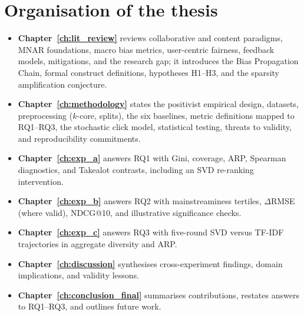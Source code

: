 \section{Organisation of the thesis}
\begin{itemize}
  \item \textbf{Chapter~\ref{ch:lit_review}} reviews collaborative and content paradigms, MNAR foundations, macro bias metrics, user-centric fairness, feedback models, mitigations, and the research gap; it introduces the Bias Propagation Chain, formal construct definitions, hypotheses H1--H3, and the sparsity amplification conjecture.
  \item \textbf{Chapter~\ref{ch:methodology}} states the positivist empirical design, datasets, preprocessing ($k$-core, splits), the six baselines, metric definitions mapped to RQ1--RQ3, the stochastic click model, statistical testing, threats to validity, and reproducibility commitments.
  \item \textbf{Chapter~\ref{ch:exp_a}} answers RQ1 with Gini, coverage, ARP, Spearman diagnostics, and Takealot contrasts, including an SVD re-ranking intervention.
  \item \textbf{Chapter~\ref{ch:exp_b}} answers RQ2 with mainstreaminess tertiles, $\Delta$RMSE (where valid), NDCG@10, and illustrative significance checks.
  \item \textbf{Chapter~\ref{ch:exp_c}} answers RQ3 with five-round SVD versus TF-IDF trajectories in aggregate diversity and ARP.
  \item \textbf{Chapter~\ref{ch:discussion}} synthesises cross-experiment findings, domain implications, and validity lessons.
  \item \textbf{Chapter~\ref{ch:conclusion_final}} summarises contributions, restates answers to RQ1--RQ3, and outlines future work.
\end{itemize}
